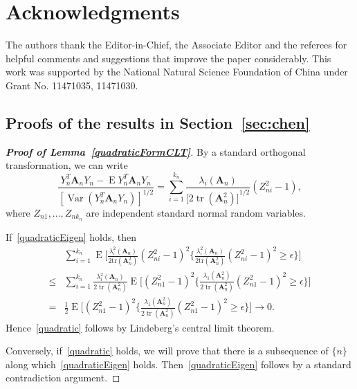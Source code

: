 \documentclass[3p]{elsarticle}
\DeclareMathOperator{\mytr}{tr}
\DeclareMathOperator{\myE}{E}
\DeclareMathOperator{\myVar}{Var}
\newcommand{\BA}{\mathbf{A}}    \newcommand{\BB}{\mathbf{B}}    \newcommand{\BC}{\mathbf{C}}    \newcommand{\BD}{\mathbf{D}}    \newcommand{\BE}{\mathbf{E}}    \newcommand{\BF}{\mathbf{F}}    \newcommand{\BG}{\mathbf{G}}    \newcommand{\BH}{\mathbf{H}}    \newcommand{\BI}{\mathbf{I}}    \newcommand{\BJ}{\mathbf{J}}    \newcommand{\BK}{\mathbf{K}}    \newcommand{\BL}{\mathbf{L}}
\theoremstyle{plain}
\theoremstyle{definition}
\theoremstyle{remark}
\begin{document}
\section*{Acknowledgments}
The authors thank the Editor-in-Chief, the Associate Editor and the referees for helpful comments and suggestions that improve the paper considerably.
This work was supported by the National Natural Science Foundation of China under Grant No. 11471035, 11471030.
\begin{appendices}
    \section{Proofs of the results in Section~\ref{sec:chen}}\label{appendixA}
\begin{proof}[\textbf{Proof of Lemma~\ref{quadraticFormCLT}}]
    By a standard orthogonal transformation, we can write
    \begin{equation}
        \frac{Y_n^T \BA_n Y_n-\myE Y_n^T \BA_n Y_n}{{[\myVar(Y_n^T \BA_n Y_n)]}^{1/2}}=\sum_{i=1}^{k_n}\frac{\lambda_i(\BA_n)}{{\big[2\mytr(\BA_n^2)\big]}^{1/2}}(Z_{ni}^2-1),
    \end{equation}
    where $Z_{n1},\ldots,Z_{n k_n}$ are independent standard normal random variables.

    If~\ref{quadraticEigen} holds, then
    \begin{equation*}
        \begin{aligned}
            &\sum_{i=1}^{k_n}\myE\Big[\frac{\lambda_i^2(\BA_n)}{2\mathrm{tr}(\BA_n^2)}{(Z_{ni}^2-1)}^2\Big\{\frac{\lambda_i^2(\BA_n)}{2\mathrm{tr}(\BA_n^2)}{(Z_{ni}^2-1)}^2\geq \epsilon\Big\}\Big]\\
            \leq&\sum_{i=1}^{k_n}
            \frac{\lambda_i^2(\BA_n)}{2\mytr(\BA_n^2)}
            \myE\Big[{(Z_{n1}^2-1)}^2\Big\{\frac{\lambda_{1}(\BA_n^2)}{2\mytr(\BA_n^2)}{(Z_{n1}^2-1)}^2\geq \epsilon\Big\}\Big]\\
            =&
            \frac{1}{2}\myE\Big[{(Z_{n1}^2-1)}^2\Big\{\frac{\lambda_{1}(\BA_n^2)}{2\mytr(\BA_n^2)}{(Z_{n1}^2-1)}^2\geq \epsilon\Big\}\Big]\to 0.
        \end{aligned}
    \end{equation*}
    Hence~\ref{quadratic} follows by Lindeberg's central limit theorem.

    Conversely, if~\ref{quadratic} holds, we will prove that there is a subsequence of $\{n\}$ along which~\ref{quadraticEigen} holds. Then~\ref{quadraticEigen} follows by a standard contradiction argument. 


\end{proof}
\end{appendices}
\end{document}
